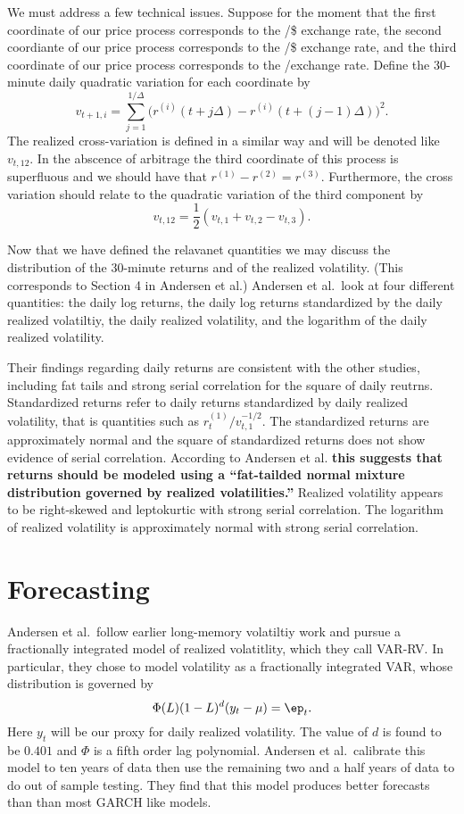 \documentclass{report}
\begin{document}
We must address a few technical issues.  Suppose for the moment that the first coordinate of our price process corresponds to the \deu/\$ exchange rate, the second coordiante of our price process corresponds to the \yen/\$ exchange rate, and the third coordinate of our price process corresponds to the \yen/\deu exchange rate.  Define the 30-minute daily quadratic variation for each coordinate by
\[
v_{t+1,i} = \sum_{j=1}^{1/\Delta} \Big( r^{(i)}(t + j \Delta)-r^{(i)}(t + (j-1) \Delta) \Big)^2.
\]
The realized cross-variation is defined in a similar way and will be denoted like $v_{t,12}$.  In the abscence of arbitrage the third coordinate of this process is superfluous and we should have that $r^{(1)} - r^{(2)} = r^{(3)}$.  Furthermore, the cross variation should relate to the quadratic variation of the third component by
\[
v_{t,12} = \frac{1}{2} (v_{t,1} + v_{t,2} - v_{t,3}).
\]

Now that we have defined the relavanet quantities we may discuss the distribution of the 30-minute returns and of the realized volatility.  (This corresponds to Section 4 in Andersen et al.)  Andersen et al.\ look at four different quantities: the daily log returns, the daily log returns standardized by the daily realized volatiltiy, the daily realized volatility, and the logarithm of the daily realized volatility.

Their findings regarding daily returns are consistent with the other studies, including fat tails and strong serial correlation for the square of daily reutrns.  Standardized returns refer to daily returns standardized by daily realized volatility, that is quantities such as $r^{(1)}_t / v^{-1/2}_{t,1}$.  The standardized returns are approximately normal and the square of standardized returns does not show evidence of serial correlation.  According to Andersen et al. \textbf{this suggests that returns should be modeled using a ``fat-tailded normal mixture distribution governed by realized volatilities.''}  Realized volatility appears to be right-skewed and leptokurtic with strong serial correlation.  The logarithm of realized volatility is approximately normal with strong serial correlation.

\section{Forecasting}

Andersen et al.\ follow earlier long-memory volatiltiy work and pursue a fractionally integrated model of realized volatitlity, which they call VAR-RV.  In particular, they chose to model volatility as a fractionally integrated VAR, whose distribution is governed by
\[
\Phi(L) (1-L)^d (y_t - \mu) = \ep_t.
\]
Here $y_t$ will be our proxy for daily realized volatility.  The value of $d$ is found to be $0.401$ and $\Phi$ is a fifth order lag polynomial.  Andersen et al.\ calibrate this model to ten years of data then use the remaining two and a half years of data to do out of sample testing.  They find that this model produces better forecasts than than most GARCH like models.
\end{document}
